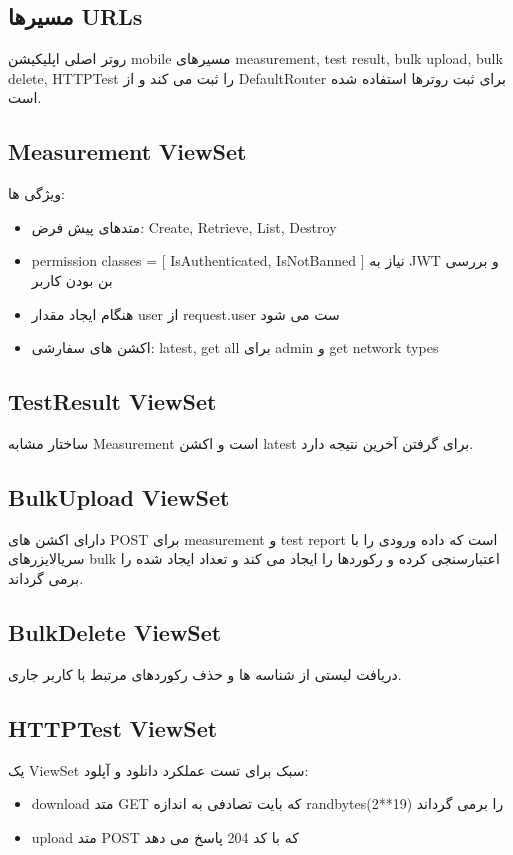 \subsection{مسیرها URLs}
روتر اصلی اپلیکیشن mobile مسیرهای measurement, test result, bulk upload, bulk delete, HTTPTest را ثبت می کند و از DefaultRouter برای ثبت روترها استفاده شده است.

\subsection{Measurement ViewSet}
ویژگی ها:
\begin{itemize}
  \item متدهای پیش فرض: Create, Retrieve, List, Destroy
  \item permission classes = [ IsAuthenticated, IsNotBanned ] نیاز به JWT و بررسی بن بودن کاربر
  \item هنگام ایجاد مقدار user از request.user ست می شود
  \item اکشن های سفارشی: latest, get all برای admin و get network types
\end{itemize}

\subsection{TestResult ViewSet}
ساختار مشابه Measurement است و اکشن latest برای گرفتن آخرین نتیجه دارد.

\subsection{BulkUpload ViewSet}
دارای اکشن های POST برای measurement و test report است که داده ورودی را با سریالایزرهای bulk اعتبارسنجی کرده و رکوردها را ایجاد می کند و تعداد ایجاد شده را برمی گرداند.

\subsection{BulkDelete ViewSet}
دریافت لیستی از شناسه ها و حذف رکوردهای مرتبط با کاربر جاری.

\subsection{HTTPTest ViewSet}
یک ViewSet سبک برای تست عملکرد دانلود و آپلود:
\begin{itemize}
  \item download متد GET که بایت تصادفی به اندازه randbytes(2**19) را برمی گرداند
  \item upload متد POST که با کد 204 پاسخ می دهد
\end{itemize}

